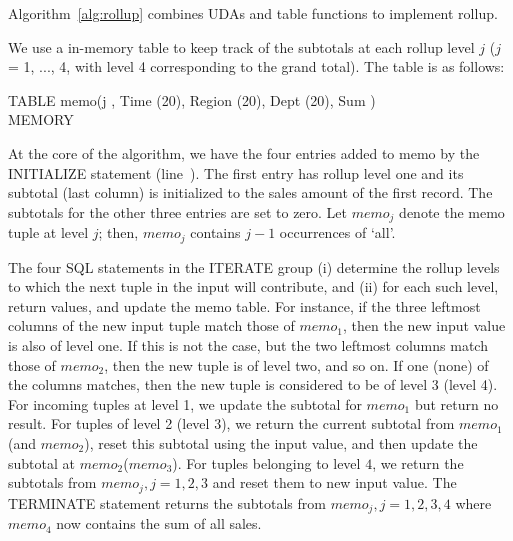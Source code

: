 {%
Algorithm~\ref{alg:rollup} combines UDAs and table functions to
implement {\bw rollup}.

We use a  in-memory table to keep track of the
subtotals at each rollup level $j$ ($j$ = 1, ..., 4, with level 4
corresponding to the grand total). The table is as follows:

{\small \begin{codedisplay}
\kw{}TABLE memo(j , Time (20), Region (20), Dept (20), Sum )\\
  \> MEMORY
\end{codedisplay}}

At the core of the algorithm, we have the four entries added to {\bw
  memo} by the {\cw INITIALIZE} statement (line~).
The first entry has rollup level one and its subtotal (last column) is
initialized to the sales amount of the first record.  The subtotals
for the other three entries are set to zero.  Let  $memo_j$ denote
the memo tuple at level $j$; then, $memo_j$ contains $j-1$ occurrences of {\bw
  `all'}.

The four SQL statements in the {\cw ITERATE} group (i) determine the
rollup levels to which the next tuple in the input will contribute,
and (ii) for each such level, return values, and update the memo
table.  For instance, if the three leftmost columns of the new input
tuple match those of $memo_1$, then the new input value is also of
level one. If this is not the case, but the two leftmost columns match
those of $memo_2$, then the new tuple is of level two, and so on.  If
one (none) of the columns matches, then the new tuple is considered to be of
level 3 (level 4).  For incoming tuples at level 1, we update the subtotal for
$memo_1$ but return no result. For tuples of level 2 (level 3), we return the
current subtotal from $memo_1$ (and $memo_2$), reset this subtotal using the input
value, and then update the subtotal at $memo_2$($memo_3$).  For tuples belonging
to level $4$, we return the subtotals from $memo_j, j=1,2,3$ and reset
them to new input value.  The {\cw TERMINATE} statement returns the
subtotals from $memo_j, j=1,2,3,4$ where $memo_4$ now contains the sum
of all sales.

}
